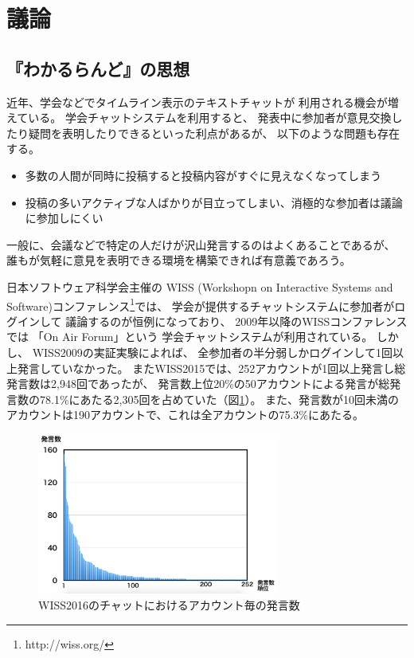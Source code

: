 \section{議論}

\subsection{『わかるらんど』の思想}

近年、学会などでタイムライン表示のテキストチャットが
利用される機会が増えている\cite{WISSのチャットの報告論文}。
学会チャットシステムを利用すると、
発表中に参加者が意見交換したり疑問を表明したりできるといった利点があるが、
以下のような問題も存在する。

\begin{itemize}
\item 多数の人間が同時に投稿すると投稿内容がすぐに見えなくなってしまう
\item 投稿の多いアクティブな人ばかりが目立ってしまい、消極的な参加者は議論に参加しにくい
\end{itemize}

一般に、会議などで特定の人だけが沢山発言するのはよくあることであるが、
誰もが気軽に意見を表明できる環境を構築できれば有意義であろう。

日本ソフトウェア科学会主催の
WISS (Workshopn on Interactive Systems and Software)コンファレンス\footnote{
  \textsf{http://wiss.org/}
}では、
学会が提供するチャットシステムに参加者がログインして
議論するのが恒例になっており、
2009年以降のWISSコンファレンスでは
「On Air Forum」\cite{OnAirForum}という
学会チャットシステムが利用されている。
%
しかし、
WISS2009の実証実験\cite{nishida2011}によれば、
全参加者の半分弱しかログインして1回以上発言していなかった。
またWISS2015では、252アカウントが1回以上発言し総発言数は2,948回であったが、
発言数上位20\%の50アカウントによる発言が総発言数の78.1\%にあたる2,305回を占めていた（図\ref{wisschat}）。
また、発言数が10回未満のアカウントは190アカウントで、これは全アカウントの75.3\%にあたる。

\begin{figure}[h]
\centering\includegraphics[width=8cm]{images/wisschat.png}
\caption{WISS2016のチャットにおけるアカウント毎の発言数}
\label{wisschat}
\end{figure}

